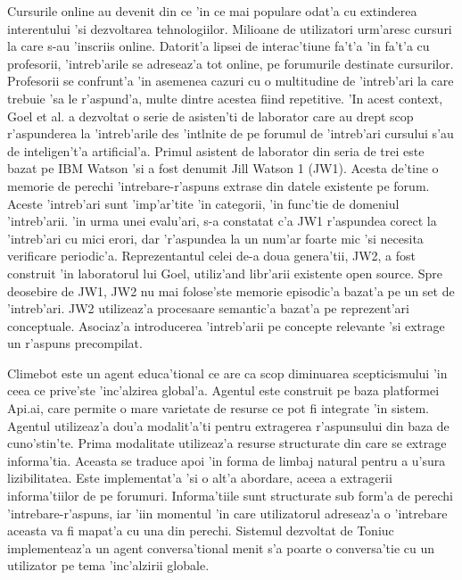 \documentclass[12pt,a4paper,twoside]{report}
\begin{document}
Cursurile online au devenit din ce 'in ce mai populare odat'a cu extinderea interentului 'si dezvoltarea tehnologiilor. Milioane de utilizatori urm'aresc cursuri la care s-au 'inscriis online. Datorit'a lipsei de interac'tiune fa't'a 'in fa't'a cu profesorii, 'intreb'arile se adreseaz'a tot online, pe forumurile destinate cursurilor. Profesorii se confrunt'a 'in asemenea cazuri cu o multitudine de 'intreb'ari la care trebuie 'sa le r'aspund'a, multe dintre acestea fiind repetitive. 'In acest context, Goel et al. \cite{WatsonAEducation} a dezvoltat o serie de asisten'ti de laborator care au drept scop r'aspunderea la 'intreb'arile des 'int\ia lnite de pe forumul de 'intreb'ari cursului s'au de inteligen't'a artificial'a. 
Primul asistent de laborator din seria de trei este bazat pe IBM Watson 'si a fost denumit Jill Watson 1 (JW1). Acesta de'tine o memorie de perechi 'intrebare-r'aspuns extrase din datele existente pe forum. Aceste 'intreb'ari sunt 'imp'ar'tite 'in categorii, 'in func'tie de domeniul 'intreb'arii. 'in urma unei evalu'ari, s-a constatat c'a JW1 r'aspundea corect la 'intreb'ari cu mici erori, dar 'r'aspundea la un num'ar foarte mic 'si necesita verificare periodic'a. Reprezentantul celei de-a doua genera'tii, JW2, a fost construit 'in laboratorul lui Goel, utiliz'and libr'arii existente open source. Spre deosebire de JW1, JW2 nu mai folose'ste memorie episodic'a bazat'a pe un set de 'intreb'ari. JW2 utilizeaz'a procesaare semantic'a bazat'a pe reprezent'ari conceptuale. Asociaz'a introducerea 'intreb'arii pe concepte relevante 'si extrage un r'aspuns precompilat.


Climebot \cite{toniuc2017climebot} este un agent educa'tional ce are ca scop diminuarea scepticismului 'in ceea ce prive'ste 'inc'alzirea global'a. Agentul este construit pe baza platformei Api.ai, care permite o mare varietate de resurse ce pot fi integrate 'in sistem. Agentul utilizeaz'a dou'a modalit'a'ti pentru extragerea r'aspunsului din baza de cuno'stin'te. Prima modalitate utilizeaz'a resurse structurate din care se extrage informa'tia. Aceasta se traduce apoi 'in forma de limbaj natural pentru a u'sura lizibilitatea. Este implementat'a 'si o alt'a abordare, aceea a extragerii informa'tiilor de pe forumuri. Informa'tiile sunt structurate sub form'a de perechi 'intrebare-r'aspuns, iar 'iin momentul 'in care utilizatorul adreseaz'a o 'intrebare aceasta va fi mapat'a cu una din perechi. Sistemul dezvoltat de Toniuc implementeaz'a un agent conversa'tional menit s'a poarte o conversa'tie cu un utilizator pe tema 'inc'alzirii globale.
\end{document}
